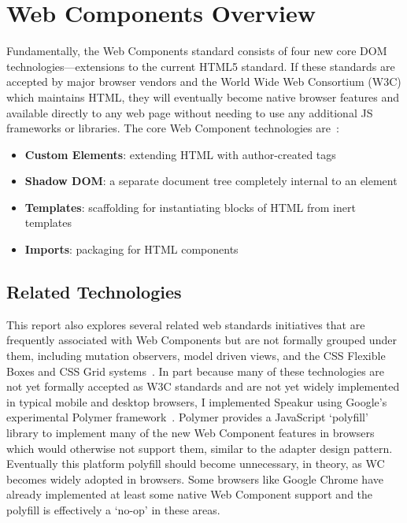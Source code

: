 \section{Web Components Overview}
Fundamentally, the Web Components standard consists of four new core DOM technologies---extensions to the current HTML5 standard.
If these standards are accepted by major browser vendors and the World Wide Web Consortium (W3C)
which maintains HTML, 
they will eventually become native browser features and available directly to any web page without needing to use any additional JS frameworks or libraries. 
The core Web Component technologies are~\cite{penades2015}:
\begin{itemize}
\item
\textbf{Custom Elements}: extending HTML with author-created tags
\item
\textbf{Shadow DOM}: a separate document tree completely internal to an element
\item
\textbf{Templates}: scaffolding for instantiating blocks of HTML from inert templates
\item
\textbf{Imports}: packaging for HTML components
\end{itemize}

\subsection{Related Technologies}
This report also explores several related web standards initiatives that are frequently associated with Web Components 
but are not formally grouped under them, including mutation observers,
model driven views, 
and the CSS Flexible Boxes
and CSS Grid
systems~\cite{w3ccontributors2014,w3ccontributors2015-d,mozillacontributors2015}. 
In part because many of these technologies are not yet formally accepted as W3C standards and are not yet widely implemented in typical mobile and desktop browsers, 
I implemented Speakur using Google's experimental Polymer framework~\cite{polymercontributors2015}.
Polymer provides a JavaScript `polyfill'
library to implement many of the new Web Component features in browsers which would otherwise not support them, 
similar to the adapter design pattern. 
Eventually this platform polyfill should become unnecessary, in theory, as WC becomes widely adopted in browsers.
Some browsers like Google Chrome 
have already implemented at least some native 
Web Component support 
and the polyfill is effectively a `no-op' in these areas.

